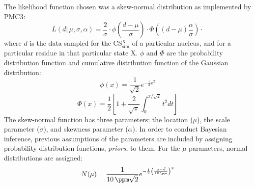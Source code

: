 \documentclass[%
 aip,
 amsmath,amssymb,
 preprint,%
]{revtex4-1}
\begin{document}
The likelihood function chosen was a skew-normal distribution as implemented by PMC3:
\begin{equation}
L(d|\,\mu, \sigma, \alpha)= \frac{2}{\sigma}\cdot
\phi\left(\frac{d-\mu}{\sigma}\right)\cdot
\Phi\left(\left(d-\mu\right)\frac{\alpha}{\sigma}\right)\cdot
\end{equation}
where $d$ is the data sampled for the CS$_\text{sim}^\text{X}$ of a particular nucleus, and for a particular residue in that particular state X. $\phi$ and $\Phi$ are the probability distribution function and cumulative distribution function of the Gaussian distribution:
\begin{equation}
\phi(x)=\frac{1}{\sqrt{2}}e^{-\frac{1}{2}x^2}
\end{equation}
\begin{equation}
\Phi(x) =\frac{1}{2}\left[1+
\frac{2}{\sqrt{\pi}}\int^{x/\sqrt{2}}_{0}t^2dt
\right]
\end{equation}
The skew-normal function has three parameters: the location ($\mu$), the scale parameter ($\sigma$), and skewness parameter ($\alpha$). In order to conduct Bayesian inference, previous assumptions of the parameters are included by assigning probability distribution functions, \textit{priors}, to them. For the $\mu$ parameters, normal distributions are assigned:
\begin{equation}
    N(\mu)=\frac{1}{\SI{10}{\ppm}\sqrt{2}}e^{-\frac{1}{2}\left(
    \frac{\mu-\bar{d}}{\SI{10}{\ppm}}
    \right)^2}
\end{equation}
\end{document}
